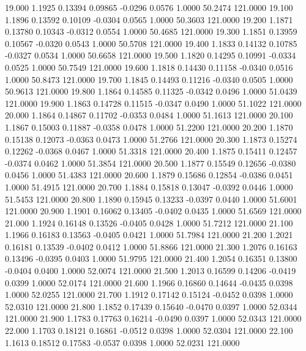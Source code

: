   19.000   1.1925   0.13394   0.09865  -0.0296   0.0576   1.0000  50.2474 121.0000
  19.100   1.1896   0.13592   0.10109  -0.0304   0.0565   1.0000  50.3603 121.0000
  19.200   1.1871   0.13780   0.10343  -0.0312   0.0554   1.0000  50.4685 121.0000
  19.300   1.1851   0.13959   0.10567  -0.0320   0.0543   1.0000  50.5708 121.0000
  19.400   1.1833   0.14132   0.10785  -0.0327   0.0534   1.0000  50.6658 121.0000
  19.500   1.1820   0.14295   0.10991  -0.0334   0.0525   1.0000  50.7549 121.0000
  19.600   1.1818   0.14430   0.11158  -0.0340   0.0516   1.0000  50.8473 121.0000
  19.700   1.1845   0.14493   0.11216  -0.0340   0.0505   1.0000  50.9613 121.0000
  19.800   1.1864   0.14585   0.11325  -0.0342   0.0496   1.0000  51.0439 121.0000
  19.900   1.1863   0.14728   0.11515  -0.0347   0.0490   1.0000  51.1022 121.0000
  20.000   1.1864   0.14867   0.11702  -0.0353   0.0484   1.0000  51.1613 121.0000
  20.100   1.1867   0.15003   0.11887  -0.0358   0.0478   1.0000  51.2200 121.0000
  20.200   1.1870   0.15138   0.12073  -0.0363   0.0473   1.0000  51.2766 121.0000
  20.300   1.1873   0.15274   0.12262  -0.0368   0.0467   1.0000  51.3318 121.0000
  20.400   1.1875   0.15411   0.12457  -0.0374   0.0462   1.0000  51.3854 121.0000
  20.500   1.1877   0.15549   0.12656  -0.0380   0.0456   1.0000  51.4383 121.0000
  20.600   1.1879   0.15686   0.12854  -0.0386   0.0451   1.0000  51.4915 121.0000
  20.700   1.1884   0.15818   0.13047  -0.0392   0.0446   1.0000  51.5453 121.0000
  20.800   1.1890   0.15945   0.13233  -0.0397   0.0440   1.0000  51.6001 121.0000
  20.900   1.1901   0.16062   0.13405  -0.0402   0.0435   1.0000  51.6569 121.0000
  21.000   1.1924   0.16148   0.13526  -0.0405   0.0428   1.0000  51.7212 121.0000
  21.100   1.1966   0.16183   0.13563  -0.0405   0.0421   1.0000  51.7984 121.0000
  21.200   1.2021   0.16181   0.13539  -0.0402   0.0412   1.0000  51.8866 121.0000
  21.300   1.2076   0.16163   0.13496  -0.0395   0.0403   1.0000  51.9795 121.0000
  21.400   1.2054   0.16351   0.13800  -0.0404   0.0400   1.0000  52.0074 121.0000
  21.500   1.2013   0.16599   0.14206  -0.0419   0.0399   1.0000  52.0174 121.0000
  21.600   1.1966   0.16860   0.14644  -0.0435   0.0398   1.0000  52.0255 121.0000
  21.700   1.1912   0.17142   0.15124  -0.0452   0.0398   1.0000  52.0310 121.0000
  21.800   1.1852   0.17439   0.15640  -0.0470   0.0397   1.0000  52.0344 121.0000
  21.900   1.1783   0.17763   0.16214  -0.0490   0.0397   1.0000  52.0343 121.0000
  22.000   1.1703   0.18121   0.16861  -0.0512   0.0398   1.0000  52.0304 121.0000
  22.100   1.1613   0.18512   0.17583  -0.0537   0.0398   1.0000  52.0231 121.0000
